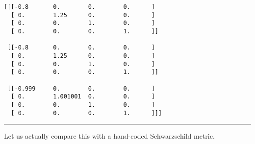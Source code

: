 \documentclass[11pt]{article}
\begin{document}
    \begin{Verbatim}[commandchars=\\\{\}]
[[[-0.8       0.        0.        0.      ]
  [ 0.        1.25      0.        0.      ]
  [ 0.        0.        1.        0.      ]
  [ 0.        0.        0.        1.      ]]

 [[-0.8       0.        0.        0.      ]
  [ 0.        1.25      0.        0.      ]
  [ 0.        0.        1.        0.      ]
  [ 0.        0.        0.        1.      ]]

 [[-0.999     0.        0.        0.      ]
  [ 0.        1.001001  0.        0.      ]
  [ 0.        0.        1.        0.      ]
  [ 0.        0.        0.        1.      ]]]
    \end{Verbatim}

    \begin{center}\rule{0.5\linewidth}{0.5pt}\end{center}

Let us actually compare this with a hand-coded Schwarzschild metric.
\end{document}

